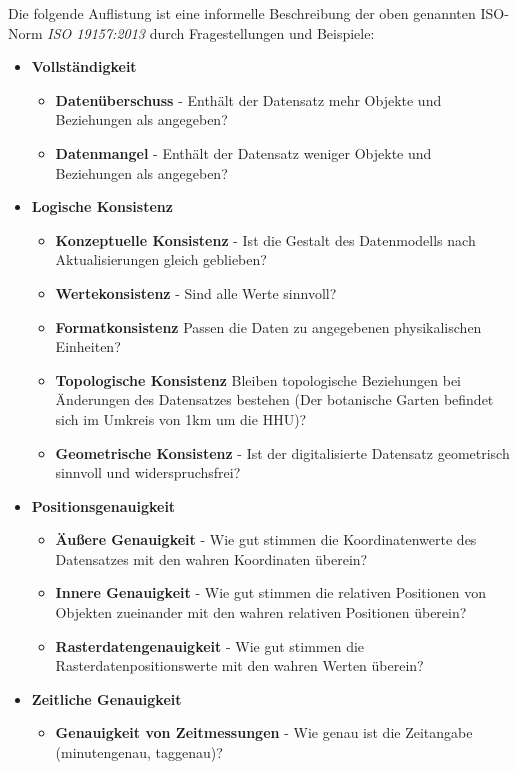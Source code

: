 \documentclass[11pt,ceqn]{book}
\begin{document}
Die folgende Auflistung ist eine informelle Beschreibung der oben genannten ISO-Norm \textit{ISO 19157:2013} durch Fragestellungen und Beispiele:

\begin{itemize}
\item \textbf{Vollständigkeit}
\begin{itemize}
\item \textbf{Datenüberschuss} -
Enthält der Datensatz mehr Objekte und Beziehungen als angegeben?
\item \textbf{Datenmangel} - Enthält der Datensatz weniger Objekte und Beziehungen als angegeben?
\end{itemize}
\item \textbf{Logische Konsistenz}
\begin{itemize}
\item \textbf{Konzeptuelle Konsistenz} - 
Ist die Gestalt des Datenmodells nach Aktualisierungen gleich geblieben?
\item \textbf{Wertekonsistenz} - Sind alle Werte sinnvoll?
\item \textbf{Formatkonsistenz} Passen die Daten zu angegebenen physikalischen Einheiten?
\item \textbf{Topologische Konsistenz} 
Bleiben topologische Beziehungen bei Änderungen des Datensatzes bestehen (Der botanische Garten befindet sich im Umkreis von 1km um die HHU)?
\item \textbf{Geometrische Konsistenz} - Ist der digitalisierte Datensatz geometrisch sinnvoll und widerspruchsfrei?
\end{itemize}
\item \textbf{Positionsgenauigkeit}
\begin{itemize}
\item
\textbf{Äußere Genauigkeit} - Wie gut stimmen die Koordinatenwerte des Datensatzes mit den wahren Koordinaten überein?
\item \textbf{Innere Genauigkeit} - Wie gut stimmen die relativen Positionen von Objekten zueinander mit den wahren relativen Positionen überein?
\item \textbf{Rasterdatengenauigkeit} - Wie gut stimmen die Rasterdatenpositionswerte mit den wahren Werten überein?
\end{itemize}
\item \textbf{Zeitliche Genauigkeit}
\begin{itemize}
\item
\textbf{Genauigkeit von Zeitmessungen} - 
Wie genau ist die Zeitangabe (minutengenau, taggenau)?

\end{itemize}
\end{itemize}
\end{document}
